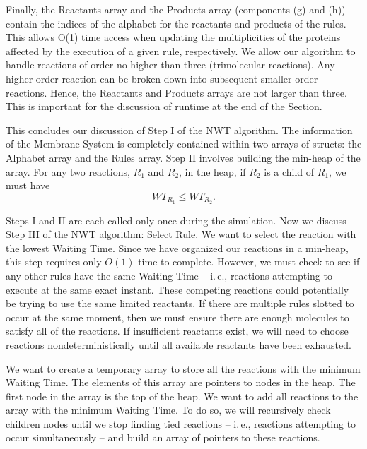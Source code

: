 \documentclass[copyright]{eptcs}
\begin{document}
Finally, the Reactants array and the Products array (components (g) and (h)) contain the indices of the alphabet for the reactants and products of the rules.  This allows O(1) time access when updating the multiplicities of the proteins affected by the execution of a given rule, respectively.  We allow our algorithm to handle reactions of order no higher than three (trimolecular reactions).  Any higher order reaction can be broken down into subsequent smaller order reactions.  Hence, the Reactants and Products arrays are not larger than three.  This is important for the discussion of runtime at the end of the Section.

This concludes our discussion of Step I of the NWT algorithm.  The information of the Membrane System is completely contained within two arrays of structs: the Alphabet array and the Rules array.  Step II involves building the min-heap of the array.  For any two reactions, $R_1$ and $R_2$, in the heap, if $R_2$ is a child of $R_1$, we must have
\begin{equation}
WT_{R_1}\leq WT_{R_2}.
\label{minheapproperty}
\end{equation}

Steps I and II are each called only once during the simulation.  Now we discuss Step III of the NWT algorithm: Select Rule.  We want to select the reaction with the lowest Waiting Time.  Since we have organized our reactions in a min-heap, this step requires only $O(1)$ time to complete.  However, we must check to see if any other rules have the same Waiting Time -- i.\,e., reactions attempting to execute at the same exact instant.  These competing reactions could potentially be trying to use the same limited reactants.  If there are multiple rules slotted to occur at the same moment, then we must ensure there are enough molecules to satisfy all of the reactions.  If insufficient reactants exist, we will need to choose reactions nondeterministically until all available reactants have been exhausted.

We want to create a temporary array to store all the reactions with the minimum Waiting Time.  The elements of this array are pointers to nodes in the heap.  The first node in the array is the top of the heap.  We want to add all reactions to the array with the minimum Waiting Time.  To do so, we will recursively check children nodes until we stop finding tied reactions -- i.\,e., reactions attempting to occur simultaneously -- and build an array of pointers to these reactions.  
\end{document}

